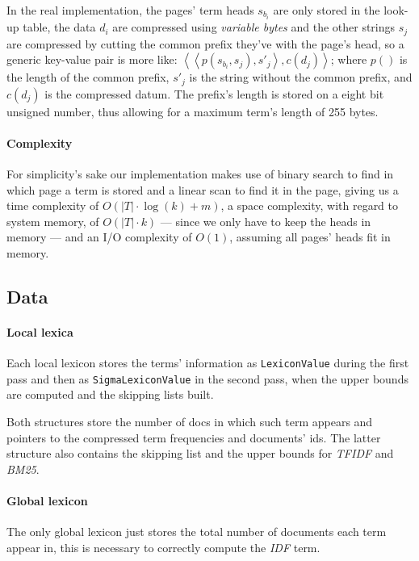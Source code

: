 In the real implementation, the pages' term heads $s_{b_i}$ are only stored in the look-up table, the data $d_i$ are compressed using \textit{variable bytes} and the other strings $s_j$ are compressed by cutting the common prefix they've with the page's head, so a generic key-value pair is more like:
$\left<	\left< p(s_{b_i}, s_j), {s'}_j \right>, c(d_j)	\right>$; where $p()$ is the length of the common prefix, $ {s'}_j$ is the string without the common prefix, and $c(d_j)$ is the compressed datum. The prefix's length is stored on a eight bit unsigned number, thus allowing for a maximum term's length of 255 bytes.

\paragraph{Complexity}
For simplicity's sake our implementation makes use of binary search to find in which page a term is stored and a linear scan to find it in the page, giving us a time complexity of 
$O\left(	|T|\cdot\log(k) + m	\right)$,
a space complexity, with regard to system memory, of
$O\left(	|T|\cdot k	\right)$
--- since we only have to keep the heads in memory --- and an I/O complexity of
$O\left(	1	\right)$, assuming all pages' heads fit in memory.

\subsection{Data}

\paragraph{Local lexica}
Each local lexicon stores the terms' information as \texttt{LexiconValue} during the first pass and then as \texttt{SigmaLexiconValue} in the second pass, when the upper bounds are computed and the skipping lists built.

Both structures store the number of docs in which such term appears and pointers to the compressed term frequencies and documents' ids. The latter structure also contains the skipping list and the upper bounds for \textit{TFIDF} and \textit{BM25}.

\paragraph{Global lexicon}
The only global lexicon just stores the total number of documents each term appear in, this is necessary to correctly compute the \textit{IDF} term.

